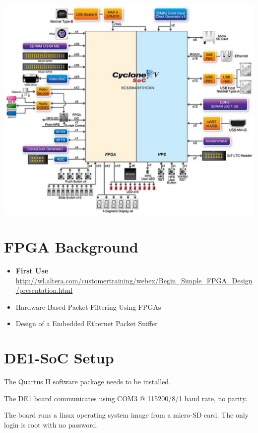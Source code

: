 \begin{center}
\includegraphics[scale=0.75]{eps/DE1SoCports.eps}
\vskip 0.1in
\end{center}

\section{FPGA Background}
\begin{itemize}
\item {\bf First Use}
\url{http://wl.altera.com/customertraining/webex/Begin_Simple_FPGA_Design/presentation.html}
\item Hardware-Based Packet Filtering Using FPGAs\cite{25}
\item Design of a Embedded Ethernet Packet Sniffer\cite{26}
\end{itemize}

\section{DE1-SoC Setup}
The Quartus II software package needs to be installed.

The DE1 board communicates using COM3 @ 115200/8/1 baud rate, no parity.

The board runs a linux operating system image from a micro-SD card.
The only login is root with no password.





